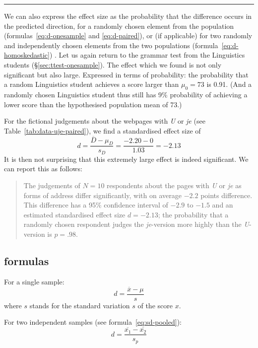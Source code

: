 \documentclass[
]{book}
\begin{document}
\begin{center}\rule{0.5\linewidth}{0.5pt}\end{center}

We can also express the effect size as the probability that
the difference occurs in the predicted direction, for a randomly
chosen element from the population
(formulas~\eqref{eq:d-onesample} and \eqref{eq:d-paired}),
or (if applicable) for two
randomly and independently chosen elements from the two populations
(formula~\eqref{eq:d-homoskedastic}) \citep{McGraw92}. Let us again return to
the grammar test from the Linguistics students
(§\ref{sec:ttest-onesample}). The effect which we found is
not only significant but also large. Expressed in terms of probability:
the probability that a random Linguistics student achieves a score
larger than \(\mu_0=73\) is 0.91. (And a randomly chosen
Linguistics student thus still has 9\% probability of achieving a lower score than
the hypothesised population mean of 73.)

For the fictional judgements about the webpages with \emph{U} or \emph{je} (see
Table~\ref{tab:data-uje-paired}), we find a standardised
effect size of
\[d = \frac{ \overline{D}-\mu_D} {s_D} = \frac{ -2.20-0 } {1.03} = -2.13\]
It is then not surprising that this extremely large effect is indeed
significant. We can report this as follows:

\begin{quote}
The judgements of \(N=10\) respondents about the pages with \emph{U} or \emph{je}
as forms of address differ significantly, with on average \(-2.2\) points
difference. This difference has a 95\% confidence interval of
\(-2.9\) to \(-1.5\) and an estimated standardised effect size
\(d=-2.13\); the probability that a randomly chosen respondent
judges the \emph{je}-version more highly than the \emph{U}-version is \(p=.98\).
\end{quote}

\hypertarget{sec:formulas13-5}{%
\subsection{formulas}\label{sec:formulas13-5}}

For a single sample:
\begin{equation}
   \label{eq:d-onesample}
  d = \frac{\overline{x}-\mu}{s}
\end{equation}
where \(s\) stands for the standard variation \(s\)
of the score \(x\).

For two independent samples (see
formula~\eqref{eq:sd-pooled}):
\begin{equation}
  \label{eq:d-homoskedastic}
  d = \frac{ \overline{x_1}-\overline{x_2} } { s_p }
\end{equation}
\end{document}
